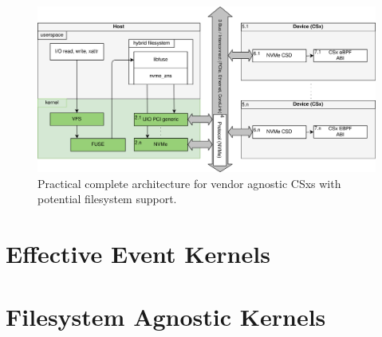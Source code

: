 \begin{figure}
    \centering
	\includegraphics[width=1\textwidth]{resources/images/loader-pfs-arch-v3.png}
	\caption{Practical complete architecture for vendor agnostic CSxs with
        potential filesystem support.}
    \label{figure:practicalarchitecture}
\end{figure}

\section{Effective Event Kernels}






\section{Filesystem Agnostic Kernels}

